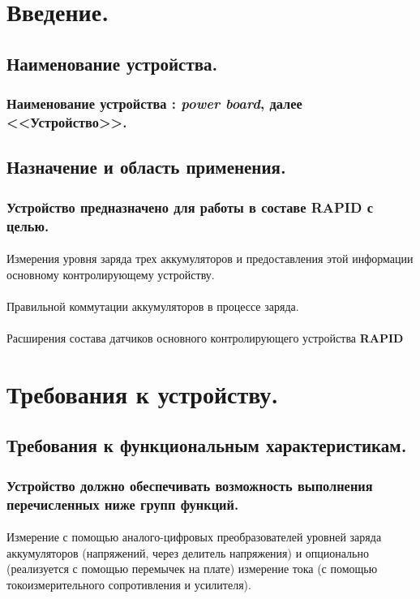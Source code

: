 \documentclass[pdftex,14pt,a4paper,russian,utf8]{article}
\begin{document}



\section{Введение.}
\subsection{Наименование устройства.}
\subsubsection{Наименование устройства : \textit{power board}, далее <<Устройство>>.}
\subsection{Назначение и область применения.}
\subsubsection{Устройство предназначено для работы в составе \textbf{RAPID} с целью.}
\paragraph{}{Измерения уровня заряда трех аккумуляторов и предоставления этой информации основному контролирующему устройству.}
\paragraph{}{Правильной коммутации аккумуляторов в процессе заряда.}
\paragraph{}{Расширения состава датчиков основного контролирующего устройства \textbf{RAPID}}
\section{Требования к устройству.}
\subsection{Требования к функциональным характеристикам.}
\subsubsection{Устройство должно обеспечивать возможность выполнения перечисленных ниже групп функций.}
\paragraph{}{Измерение с помощью аналого-цифровых преобразователей уровней заряда аккумуляторов (напряжений, через делитель напряжения) и опционально (реализуется с помощью перемычек на плате) измерение тока (с помощью токоизмерительного сопротивления и усилителя).}
\end{document}
